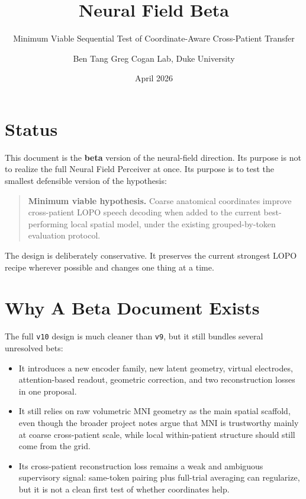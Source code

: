 \documentclass[
]{article}
\title{Neural Field Beta}
\subtitle{Minimum Viable Sequential Test of Coordinate-Aware
Cross-Patient Transfer}
\author{Ben Tang \textbar{} Greg Cogan Lab, Duke University}
\date{April 2026}
\providecommand{\tightlist}{%
  \setlength{\itemsep}{0pt}\setlength{\parskip}{0pt}}
\begin{document}
\maketitle

{
\setcounter{tocdepth}{3}
\tableofcontents
}
\section{Status}\label{status}

This document is the \textbf{beta} version of the neural-field
direction. Its purpose is not to realize the full Neural Field Perceiver
at once. Its purpose is to test the smallest defensible version of the
hypothesis:

\begin{quote}
\textbf{Minimum viable hypothesis.} Coarse anatomical coordinates
improve cross-patient LOPO speech decoding when added to the current
best-performing local spatial model, under the existing grouped-by-token
evaluation protocol.
\end{quote}

The design is deliberately conservative. It preserves the current
strongest LOPO recipe wherever possible and changes one thing at a time.

\section{Why A Beta Document Exists}\label{why-a-beta-document-exists}

The full \texttt{v10} design is much cleaner than \texttt{v9}, but it
still bundles several unresolved bets:

\begin{itemize}
\tightlist
\item
  It introduces a new encoder family, new latent geometry, virtual
  electrodes, attention-based readout, geometric correction, and two
  reconstruction losses in one proposal.
\item
  It still relies on raw volumetric MNI geometry as the main spatial
  scaffold, even though the broader project notes argue that MNI is
  trustworthy mainly at coarse cross-patient scale, while local
  within-patient structure should still come from the grid.
\item
  Its cross-patient reconstruction loss remains a weak and ambiguous
  supervisory signal: same-token pairing plus full-trial averaging can
  regularize, but it is not a clean first test of whether coordinates
  help.
\end{itemize}
\end{document}
